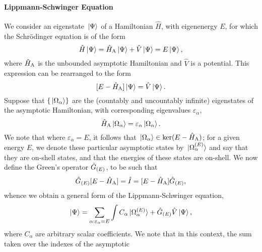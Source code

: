 \documentclass[draft]{article}
\begin{document}
\paragraph{Lippmann-Schwinger Equation}
\label{sec:lippmann-schwinger}

We consider an eigenstate $\ket*{\Psi}$ of a Hamiltonian $\hat{H}$, with
eigenenergy $E$, for which the Schr\"odinger equation is of the form
\begin{equation}
  \label{eq:schrodinger}
  \hat{H}
  \ket{\Psi}
  =
  \hat{H}_{\rm{A}}
  \ket{\Psi}
  +
  \hat{V}
  \ket{\Psi}
  =
  E
  \ket{\Psi}
  ,
\end{equation}
where $\hat{H}_{\rm{A}}$ is the unbounded asymptotic Hamiltonian and $\hat{V}$
is a potential.
This expression can be rearranged to the form
\begin{equation}
  \label{eq:schrodinger-2}
  [
    E
    -
    \hat{H}_{\rm{A}}
  ]
  \ket{\Psi}
  =
  \hat{V}
  \ket{\Psi}
  .
\end{equation}
Suppose that $\lbrace\ket*{\Omega_{\alpha}}\rbrace$ are the (countably and
uncountably infinite) eigenstates of the asymptotic Hamiltonian, with
corresponding eigenvalues
$\varepsilon_{\alpha}$,
\begin{equation}
  \label{eq:schrodinger-asymptotic}
  \hat{H}_{\rm{A}}
  \ket{\Omega_{\alpha}}
  =
  \varepsilon_{\alpha}
  \ket{\Omega_{\alpha}}
  .
\end{equation}
We note that where $\varepsilon_{\alpha} = E$, it follows that
$\ket*{\Omega_{\alpha}} \in \ker(E - \hat{H}_{\rm{A}})$; for a given energy
$E$, we denote these particular asymptotic states by
$\ket*{\Omega_{\alpha}^{(E)}}$ and say that they are on-shell states, and
that the energies of these states are on-shell.
We now define the Green's operator $\hat{G}_{(E)}$, to be such that
\begin{equation}
  \label{eq:greens-operator}
  \hat{G}_{(E)}
  [
    E
    -
    \hat{H}_{\rm{A}}
  ]
  =
  \hat{I}
  =
  [
    E
    -
    \hat{H}_{\rm{A}}
  ]
  \hat{G}_{(E)}
  ,
\end{equation}
whence we obtain a general form of the Lippmann-Schwinger equation,
\begin{equation}
  \label{eq:ls}
  \ket{\Psi}
  =
  \sum_{\alpha : \varepsilon_{\alpha} = E}\int
  C_{\alpha}
  \ket*{\Omega_{\alpha}^{(E)}}
  +
  \hat{G}_{(E)}
  \hat{V}
  \ket{\Psi}
  ,
\end{equation}
where $C_{\alpha}$ are arbitrary scalar coefficients.
We note that in this context, the sum taken over the indexes of the asymptotic
\end{document}
